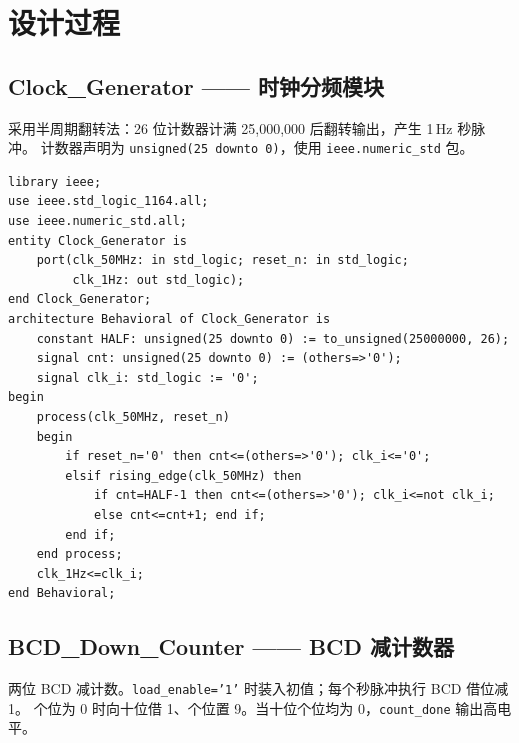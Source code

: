 \documentclass[12pt,a4paper]{ctexart}
\begin{document}
\section{设计过程}

\subsection{Clock\_Generator —— 时钟分频模块}

采用半周期翻转法：26 位计数器计满 25,000,000 后翻转输出，产生 1\,Hz 秒脉冲。
计数器声明为 \texttt{unsigned(25 downto 0)}，使用 \texttt{ieee.numeric\_std} 包。

\begin{lstlisting}[caption={Clock\_Generator.vhd}]
library ieee;
use ieee.std_logic_1164.all;
use ieee.numeric_std.all;
entity Clock_Generator is
    port(clk_50MHz: in std_logic; reset_n: in std_logic;
         clk_1Hz: out std_logic);
end Clock_Generator;
architecture Behavioral of Clock_Generator is
    constant HALF: unsigned(25 downto 0) := to_unsigned(25000000, 26);
    signal cnt: unsigned(25 downto 0) := (others=>'0');
    signal clk_i: std_logic := '0';
begin
    process(clk_50MHz, reset_n)
    begin
        if reset_n='0' then cnt<=(others=>'0'); clk_i<='0';
        elsif rising_edge(clk_50MHz) then
            if cnt=HALF-1 then cnt<=(others=>'0'); clk_i<=not clk_i;
            else cnt<=cnt+1; end if;
        end if;
    end process;
    clk_1Hz<=clk_i;
end Behavioral;
\end{lstlisting}

\subsection{BCD\_Down\_Counter —— BCD 减计数器}

两位 BCD 减计数。\texttt{load\_enable='1'} 时装入初值；每个秒脉冲执行 BCD 借位减 1。
个位为 0 时向十位借 1、个位置 9。当十位个位均为 0，\texttt{count\_done} 输出高电平。
\end{document}
